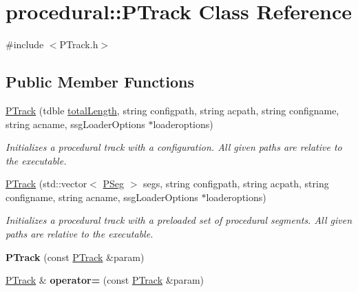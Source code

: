 \hypertarget{classprocedural_1_1_p_track}{\section{procedural\-:\-:P\-Track Class Reference}
\label{classprocedural_1_1_p_track}
}


{\ttfamily \#include $<$P\-Track.\-h$>$}

\subsection*{Public Member Functions}
\begin{DoxyCompactItemize}
\item 
\hyperlink{classprocedural_1_1_p_track_a7c25a262dd422645317347d1c05a051f}{P\-Track} (tdble \hyperlink{classprocedural_1_1_p_track_a5b2eda49220f8825f55624faf62aa106}{total\-Length}, string configpath, string acpath, string configname, string acname, ssg\-Loader\-Options $\ast$loaderoptions)
\begin{DoxyCompactList}\small\item\em Initializes a procedural track with a configuration. All given paths are relative to the executable. \end{DoxyCompactList}\item 
\hyperlink{classprocedural_1_1_p_track_a5a1565c1d99e110cbeddfcf60b168044}{P\-Track} (std\-::vector$<$ \hyperlink{classprocedural_1_1_p_seg}{P\-Seg} $>$ segs, string configpath, string acpath, string configname, string acname, ssg\-Loader\-Options $\ast$loaderoptions)
\begin{DoxyCompactList}\small\item\em Initializes a procedural track with a preloaded set of procedural segments. All given paths are relative to the executable. \end{DoxyCompactList}\item 
\hypertarget{classprocedural_1_1_p_track_a1e19ffc2655507cd25dfbe10a5c06b32}{{\bfseries P\-Track} (const \hyperlink{classprocedural_1_1_p_track}{P\-Track} \&param)}\label{classprocedural_1_1_p_track_a1e19ffc2655507cd25dfbe10a5c06b32}

\item 
\hypertarget{classprocedural_1_1_p_track_a157a828e2a8214db96009d2cd826d45a}{\hyperlink{classprocedural_1_1_p_track}{P\-Track} \& {\bfseries operator=} (const \hyperlink{classprocedural_1_1_p_track}{P\-Track} \&param)}\label{classprocedural_1_1_p_track_a157a828e2a8214db96009d2cd826d45a}


\end{DoxyCompactItemize}
